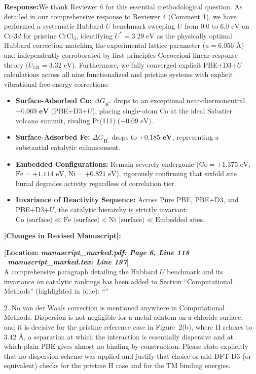 \documentclass[11pt, sans, a4paper]{moderncv}
\newcommand{\response}{\vspace{0.4em}\noindent\textbf{\color{actionblue}Response:}\hspace{0.5em}}
\newcommand{\manuscriptchange}[1]{{\renewcommand{\label}[1]{}\vspace{0.4em}\noindent\textbf{\color{acsblue}[Changes in Revised Manuscript]:}\par\nopagebreak\vspace{0.15em}#1\vspace{0.4em}}}
\begin{document}
\response We thank Reviewer 6 for this essential methodological question. As detailed in our comprehensive response to Reviewer 4 (Comment 1), we have performed a systematic Hubbard $U$ benchmark sweeping $U$ from $0.0$ to $6.0\text{ eV}$ on Cr-$3d$ for pristine $\text{CrCl}_3$, identifying $U^* = 3.29\text{ eV}$ as the physically optimal Hubbard correction matching the experimental lattice parameter ($a = 6.056\text{ \AA}$) and independently corroborated by first-principles Cococcioni linear-response theory ($U_{\text{LR}} = 3.32\text{ eV}$). Furthermore, we fully converged explicit PBE+D3+$U$ calculations across all nine functionalized and pristine systems with explicit vibrational free-energy corrections:
\begin{itemize}[leftmargin=1.5em, itemsep=0.2em]
\item \textbf{Surface-Adsorbed Co:} $\Delta G_{\mathrm{H}^*}$ drops to an exceptional near-thermoneutral $\mathbf{-0.069\text{ eV}}$ (PBE+D3+$U$), placing single-atom Co at the ideal Sabatier volcano summit, rivaling Pt(111) ($-0.09\text{ eV}$).
\item \textbf{Surface-Adsorbed Fe:} $\Delta G_{\mathrm{H}^*}$ drops to $\mathbf{+0.185\text{ eV}}$, representing a substantial catalytic enhancement.
\item \textbf{Embedded Configurations:} Remain severely endergonic ($\text{Co} = +1.375\text{ eV}$, $\text{Fe} = +1.114\text{ eV}$, $\text{Ni} = +0.821\text{ eV}$), rigorously confirming that sixfold site burial degrades activity regardless of correlation tier.
\item \textbf{Invariance of Reactivity Sequence:} Across Pure PBE, PBE+D3, and PBE+D3+$U$, the catalytic hierarchy is strictly invariant: $\text{Co (surface)} \ll \text{Fe (surface)} < \text{Ni (surface)} \ll \text{Embedded sites}$.
\end{itemize}

\manuscriptchange{\textbf{[Location: \textit{manuscript\_marked.pdf: Page 6, Line 118} \textbar\ \textit{manuscript\_marked.tex: Line 197}]}\\ A comprehensive paragraph detailing the Hubbard $U$ benchmark and its invariance on catalytic rankings has been added to Section ``Computational Methods'' (highlighted in blue): ``{\itshape \ExecuteMetaData[manuscript_marked.tex]{PBEHubbardU}}''}

\vspace{0.8em}

\begin{reviewercomment}
2. No van der Waals correction is mentioned anywhere in Computational Methods. Dispersion is not negligible for a metal adatom on a chloride surface, and it is decisive for the pristine reference case in Figure~2(b), where H relaxes to $3.42\text{ \AA}$, a separation at which the interaction is essentially dispersive and at which plain PBE gives almost no binding by construction. Please state explicitly that no dispersion scheme was applied and justify that choice or add DFT-D3 (or equivalent) checks for the pristine H case and for the TM binding energies.
\end{reviewercomment}
\end{document}
